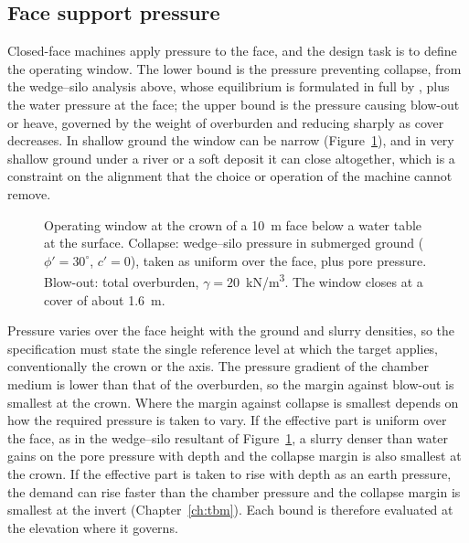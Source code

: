 \subsection{Face support pressure}
\label{sec:face-support-pressure}

Closed-face machines apply pressure to the face, and the design task is to
define the operating window. The lower bound is the pressure preventing
collapse, from the wedge--silo analysis above, whose equilibrium is
formulated in full by \citet{anagnostou1996face}, plus the water pressure at
the face; the
upper bound is the pressure causing blow-out or heave, governed by the weight
of overburden and reducing sharply as cover decreases. In shallow ground the
window can be narrow (Figure~\ref{fig:face-pressure-window}), and in very shallow ground under a river or a soft
deposit it can close altogether, which is a constraint on the alignment that
the choice or operation of the machine cannot remove.

\begin{figure}[htbp]
\centering
{}
\caption{Operating window at the crown of a 10~m face below a water table at the surface. Collapse: wedge--silo pressure in submerged ground ($\phi' = 30^\circ$, $c' = 0$), taken as uniform over the face, plus pore pressure. Blow-out: total overburden, $\gamma = 20$~kN/m\textsuperscript{3}. The window closes at a cover of about 1.6~m.}
\label{fig:face-pressure-window}
\end{figure}

Pressure varies over the face height with the ground and slurry densities, so
the specification must state the single reference level at which the target
applies, conventionally the crown or the axis. The pressure gradient of the
chamber medium is lower than that of the overburden, so the margin against
blow-out is smallest at the crown. Where the margin against collapse is
smallest depends on how the required pressure is taken to vary. If the
effective part is uniform over the face, as in the wedge--silo resultant of
Figure~\ref{fig:face-pressure-window}, a slurry denser than water gains on the
pore pressure with depth and the collapse margin is also smallest at the crown.
If the effective part is taken to rise with depth as an earth pressure, the
demand can rise faster than the chamber pressure and the collapse margin is
smallest at the invert (Chapter~\ref{ch:tbm}). Each bound is therefore
evaluated at the elevation where it governs.

